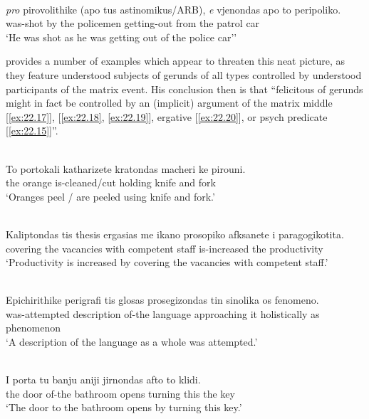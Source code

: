 \documentclass[output=paper]{langsci/langscibook}
\begin{document}
\ea%
    \label{ex:22.16} \\
    \gll    \emph{pro} pirovolithike (apo tus astinomikus/ARB), \emph{e} vjenondas  apo  to peripoliko.\\
    {}  was-shot          \hphantom{(}by   the policemen {} getting-out from the {patrol car}\\
    \glt    \enquote*{He was shot as he was getting out of the police car'}
\z

\citet{Kotzoglou2016} provides a number of examples which appear to threaten
this neat picture, as they feature understood subjects of gerunds of all types
controlled by understood participants of the matrix event. His conclusion then
is that “felicitous  of  gerunds might in fact be controlled
by an (implicit) argument of the matrix middle [\eqref{ex:22.17}],
 [\eqref{ex:22.18}, \eqref{ex:22.19}], ergative
[\eqref{ex:22.20}], or psych predicate [\eqref{ex:22.15}]”.

\ea%
\label{ex:22.17} \\
    \gll    To    portokali  katharizete  kratondas   macheri ke      pirouni.\\
    the  orange    is-cleaned/cut  holding  knife    and   fork\\
    \glt    \enquote*{Oranges peel / are peeled using knife and fork.}
\z

\ea%
    \label{ex:22.18} \\
    \gll    Kaliptondas tis    {thesis ergasias} me     ikano             prosopiko afksanete      i   paragogikotita.\\
            covering     the  vacancies            with competent  staff is-increased the   productivity\\
    \glt    \enquote*{Productivity is increased by covering the vacancies with competent staff.}
\z

\ea%
    \label{ex:22.19} \\
    \gll    Epichirithike  perigrafi  tis  glosas    prosegizondas  tin sinolika   os  fenomeno.\\
            was-attempted  description  of-the  language  approaching  it holistically   as  phenomenon\\
    \glt    \enquote*{A description of the language as a whole was attempted.}
\z


\ea%
    \label{ex:22.20} \\
    \gll    I       porta   tu  banju    aniji  jirnondas  afto to  klidi.\\
            the   door    of-the  bathroom  opens  turning      this the  key\\
    \glt    \enquote*{The door to the bathroom opens by turning this key.}
\z
\end{document}
